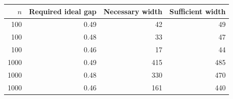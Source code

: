 \begin{tabular}{rrrr}
\hline
$n$ & Required ideal gap & Necessary width & Sufficient width \\
\hline
100 & 0.49 & 42 & 49 \\
100 & 0.48 & 33 & 47 \\
100 & 0.46 & 17 & 44 \\
1000 & 0.49 & 415 & 485 \\
1000 & 0.48 & 330 & 470 \\
1000 & 0.46 & 161 & 440 \\
\hline
\end{tabular}
